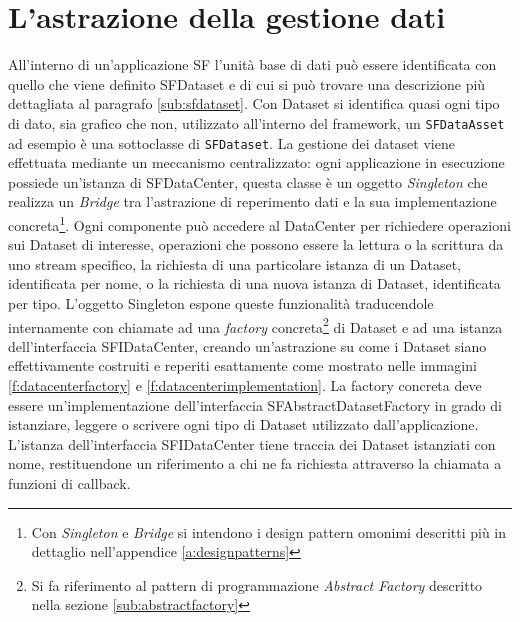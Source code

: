 \section{L'astrazione della gestione dati}
\label{sec:astrazione}
All'interno di un'applicazione \ac{SF} l'unit\`a base di dati pu\`o essere identificata con quello che viene definito SFDataset e di cui si pu\`o trovare una descrizione pi\`u dettagliata al paragrafo \ref{sub:sfdataset}. Con Dataset si identifica quasi ogni tipo di dato, sia grafico che non, utilizzato all'interno del framework, un \texttt{SFDataAsset} ad esempio \`e una sottoclasse di \texttt{SFDataset}.
La gestione dei dataset viene effettuata mediante un meccanismo centralizzato: ogni applicazione in esecuzione possiede un'istanza di SFDataCenter, questa classe \`e un oggetto \textit{Singleton} che realizza un \textit{Bridge}
tra l'astrazione di reperimento dati e la sua implementazione concreta\footnote{Con \textit{Singleton} e \textit{Bridge} si intendono i design pattern omonimi descritti pi\`u in dettaglio nell'appendice \ref{a:designpatterns}}.
Ogni componente pu\`o accedere al DataCenter per richiedere operazioni sui Dataset di interesse, operazioni che possono essere la lettura o la scrittura da uno stream specifico, la richiesta di una particolare istanza di un Dataset, identificata per nome, o la richiesta di una nuova istanza di Dataset, identificata per tipo.
L'oggetto Singleton espone queste funzionalit\`a traducendole internamente con chiamate ad una \textit{factory} concreta\footnote{Si fa riferimento al pattern di programmazione \textit{Abstract Factory} descritto nella sezione \ref{sub:abstractfactory}}
di Dataset e ad una istanza dell'interfaccia SFIDataCenter, creando un'astrazione su come i Dataset siano effettivamente costruiti e reperiti esattamente come mostrato nelle immagini \ref{f:datacenterfactory} e \ref{f:datacenterimplementation}.
La factory concreta deve essere un'implementazione dell'interfaccia SFAbstractDatasetFactory in grado di istanziare, leggere o scrivere ogni tipo di Dataset utilizzato dall'applicazione.
L'istanza dell'interfaccia SFIDataCenter tiene traccia dei Dataset istanziati con nome, restituendone un riferimento a chi ne fa richiesta attraverso la chiamata a funzioni di callback.

